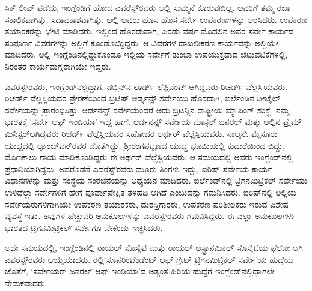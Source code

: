 ಸಿಕ್​ ಲೀವ್​ ಪಡೆದು, ಇಂಗ್ಲೆಂಡಿಗೆ ಹೋದ ಎವರೆಸ್ಟ್​ರವರು ಅಲ್ಲಿ ಸುಮ್ಮನೆ ಕೂರುವುದಿಲ್ಲ. ಅವರಿಗೆ ತಮ್ಮ ರಜಾ ಸಕಾಲಿಕವಾಗಿತ್ತು, ಸದಾವಕಾಶವಾಗಿತ್ತು. ಅಲ್ಲಿ ಅವರು ಹೊಸ ಹೊಸ ಸರ್ವೇ ಉಪಕರಣಗಳನ್ನು ಅರಸಿದರು. ಉಪಕರಣ ತಯಾರಕರನ್ನು ಭೇಟಿ ಮಾಡಿದರು. ಇಲ್ಲಿಂದ ಹೊರಡುವಾಗ, ಎರಡು ವರ್ಷ ಮೊದಲಿನ ಅವರ ಸರ್ವೇ ಕಾರ್ಯದ ಸಂಪೂರ್ಣ ವಿವರಗಳನ್ನು ಅಲ್ಲಿಗೆ ಕೊಂಡೊಯ್ದಿದ್ದರು. ಆ ವಿವರಗಳ ದಾಖಲೀಕರಣ ಕಾರ್ಯವನ್ನು ಅಲ್ಲಿಯೇ ಮಾಡಿದರು. ಅಲ್ಲಿ ಇಂಗ್ಲೆಂಡಿನಲ್ಲಿದ್ದುಕೊಂಡೂ ಇಲ್ಲಿಯ ಸರ್ವೇಗೆ ತುಂಬಾ ಉಪಯುಕ್ತವಾದ ಚಟುವಟಿಕೆಗಳಲ್ಲಿ, ನಿರಂತರ ಕಾರ್ಯಮಗ್ನರಾಗಿಯೇ ಇದ್ದರು.

ಎವರೆಸ್ಟ್​ರವರು, ಇಂಗ್ಲೆಂಡ್​ನಲ್ಲಿದ್ದಾಗ, ಡಬ್ಲಿನ್​ನ ಲಾರ್ಡ್ ಲೆಫ್ಟಿನೆಂಟ್​ ಆಗಿದ್ದವರು ರಿಚರ್ಡ್ ವೆಲ್ಲಸ್ಲಿಯವರು. ರಿಚರ್ಡ್ ವೆಲ್ಲಸ್ಲಿಯವರ ಪ್ರೇರಣೆಯಿಂದ ಬ್ರಿಟಿಷ್​ ಆರ್ಡ್ನನ್ಸ್​ ಸರ್ವೇಯು ಹೊಸದಾಗಿ, ಐರ್ಲೆಂಡಿನ ಡೀಟೈಲ್​ ಸರ್ವೇಯನ್ನು ಪ್ರಾರಂಭಿಸಿತ್ತು. ಆರ್ಡನನ್ಸ್​ ಸರ್ವೇಯೆಂದರೆ ಅದು ಬ್ರಿಟನ್ನಿನ ರಾಷ್ಟ್ರೀಯ ಮ್ಯಾಪಿಂಗ್​ ಸಂಸ್ಥೆ. ನಮ್ಮ ಭಾರತಕ್ಕೆ ‘ಸರ್ವೇ ಆಫ್​ ಇಂಡಿಯಾ’ ಇದ್ದ ಹಾಗೆ. ಆರ್ಡನನ್ಸ್​ ಸರ್ವೇಯ ಮಾಸ್ಟರ್​ ಜನರಲ್​ ಮತ್ತು ಅಲ್ಲಿನ ಪ್ರೈಮ್ ಮಿನಿಸ್ಟರ್​ ಆಗಿದ್ದವರು ರಿಚರ್ಡ್ ವೆಲ್ಲೆಸ್ಲಿಯವರ ಸಹೋದರ ಅರ್ಥರ್​ ವೆಲ್ಲೆಸ್ಲಿಯವರು. ನಾಲ್ಕನೇ ಮೈಸೂರು ಯುದ್ದದಲ್ಲಿ ಲ್ಯಾಂಬ್​ಟನ್​ರವರ ಜೊತೆಗಿದ್ದು, ಶ‍್ರೀರಂಗಪಟ್ಟಣದ ಯುದ್ಧ ಭೂಮಿಯಲ್ಲಿ ಕುದುರೆಯಿಂದ ಬಿದ್ದು, ಮೊಣಕಾಲು ಗಾಯ ಮಾಡಿಕೊಂಡಿದ್ದರು ಈ ಅರ್ಥರ್​ ವೆಲ್ಲೆಸ್ಲಿಯವರು. ಆ ಸಮಯದಲ್ಲಿ ಅವರು ಇಂಗ್ಲೆಂಡ್​ನಲ್ಲಿ ಪ್ರಧಾನಿಯಾಗಿದ್ದರು. ಅವರೊಡನೆ ಎವರೆಸ್ಟ್​ರವರು ಮೂರು ತಿಂಗಳು ಇದ್ದು, ಐರಿಷ್​ ಸರ್ವೇಯ ಕಾರ್ಯ ವಿಧಾನಗಳನ್ನು ಮತ್ತು ಸಂಸ್ಥೆಯ ಸಂರಚನೆಯನ್ನು ಅಧ್ಯಯನ ಮಾಡಿದರು. ಐರ್ಲೆಂಡ್​ನಲ್ಲಿ ಟ್ರಿಗನಮಿಟ್ರಿಕಲ್​ ಸರ್ವೇಯು ಉಳಿದೆಲ್ಲಾ ಸರ್ವೇಗಳಿಗೆ ಹೇಗೆ ಪೂರ್ವಾಪೇಕ್ಷಿತ ತಳಹದಿ ಆಗಿದೆ ಎಂಬುದನ್ನು ಗಮನಿಸಿದರು. ಐರಿಷ್​ನಲ್ಲಿ ಅಲ್ಲಿಯ ಸರ್ವೇಯರುಗಳಿಗಾಗಿಯೇ ಉಪಕರಣ ತಯಾರಕರು, ದುರಸ್ತಿಗಾರರು, ಉಪಕರಣ ಪರಿಶೀಲಕರು ಇರುವ ವಿಶೇಷ ವ್ಯವಸ್ಥೆ ಇತ್ತು. ಅವುಗಳ ಹೆಚ್ಚುವರಿ ಅನುಕೂಲಗಳನ್ನು ಎವರೆಸ್ಟ್​ರವರು ಗಮನಿಸಿದ್ದರು. ಈ ಎಲ್ಲಾ ಅನುಕೂಲಗಳು ಭಾರತದ ಟ್ರಿಗನಮಿಟ್ರಿಕಲ್​ ಸರ್ವೇಗೂ ಬೇಕೆಂದು ಇಚ್ಛಿಸಿದರು.

ಅದೇ ಸಮಯದಲ್ಲಿ, ಇಂಗ್ಲೆಂಡಿನಲ್ಲಿ ರಾಯಲ್​ ಸೊಸೈಟಿ ಮತ್ತು ರಾಯಲ್​ ಅಸ್ಟ್ರಾನಮಿಕಲ್​ ಸೊಸೈಟಿಯ ಫೆಲೋ ಆಗಿ ಎವರೆಸ್ಟ್​ರವರು ಆಯ್ಕೆಯಾದರು. ರಲ್ಲಿ\break ‘ಸೂಪರಿಂಟೆಂಡೆಂಟ್​ ಆಫ್​ ಗ್ರೇಟ್​ ಟ್ರಿಗನಮಿಟ್ರಿಕಲ್​ ಸರ್ವೇ’ಯ ಹುದ್ದೆಯ ಜೊತೆಗೆ, ‘ಸರ್ವೇಯರ್​ ಜನರಲ್​ ಆಫ್​ ಇಂಡಿಯಾ’ದ ಅತ್ಯಂತ ಹಿರಿಯ ಹುದ್ದೆಗೆ ಇಂಗ್ಲೆಂಡ್​ನಲ್ಲಿ\break ದ್ದಾಗಲೇ ನೇಮಕವಾದರು.

